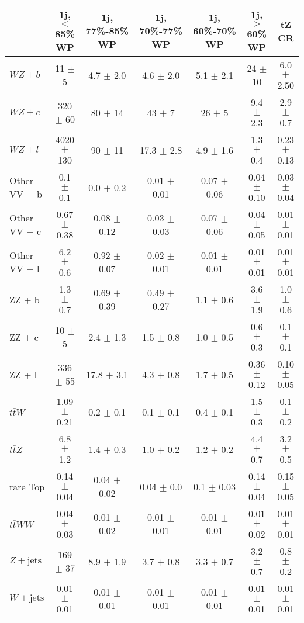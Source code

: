 \begin{tabular}{|l|c|c|c|c|c|c|}
\hline 
 & {1j, $<$85\% WP} & {1j, 77\%-85\% WP} & {1j, 70\%-77\% WP} & {1j, 60\%-70\% WP} & {1j, $>$60\% WP} & {tZ CR}\\
\hline 
  $WZ + b$   & 11 $\pm$ 5 & 4.7 $\pm$ 2.0 & 4.6 $\pm$ 2.0 & 5.1 $\pm$ 2.1 & 24 $\pm$ 10 & 6.0 $\pm$ 2.50 \\ 
  $WZ + c$   & 320 $\pm$ 60 & 80 $\pm$ 14 & 43 $\pm$ 7 & 26 $\pm$ 5 & 9.4 $\pm$ 2.3 & 2.9 $\pm$ 0.7 \\ 
  $WZ + l$   & 4020 $\pm$ 130 & 90 $\pm$ 11 & 17.3 $\pm$ 2.8 & 4.9 $\pm$ 1.6 & 1.3 $\pm$ 0.4 & 0.23 $\pm$ 0.13 \\ 
  Other VV + b   & 0.1 $\pm$ 0.1 & 0.0 $\pm$ 0.2 & 0.01 $\pm$ 0.01 & 0.07 $\pm$ 0.06 & 0.04 $\pm$ 0.10 & 0.03 $\pm$ 0.04 \\ 
  Other VV + c   & 0.67 $\pm$ 0.38 & 0.08 $\pm$ 0.12 & 0.03 $\pm$ 0.03 & 0.07 $\pm$ 0.06 & 0.04 $\pm$ 0.05 & 0.01 $\pm$ 0.01 \\ 
  Other VV + l   & 6.2 $\pm$ 0.6 & 0.92 $\pm$ 0.07 & 0.02 $\pm$ 0.01 & 0.01 $\pm$ 0.01 & 0.01 $\pm$ 0.01 & 0.01 $\pm$ 0.01 \\
  ZZ + b   & 1.3 $\pm$ 0.7 & 0.69 $\pm$ 0.39 & 0.49 $\pm$ 0.27 & 1.1 $\pm$ 0.6 & 3.6 $\pm$ 1.9 & 1.0 $\pm$ 0.6 \\ 
  ZZ + c   & 10 $\pm$ 5 & 2.4 $\pm$ 1.3 & 1.5 $\pm$ 0.8 & 1.0 $\pm$ 0.5 & 0.6 $\pm$ 0.3 & 0.1 $\pm$ 0.1 \\ 
  ZZ + l  & 336 $\pm$ 55 & 17.8 $\pm$ 3.1 & 4.3 $\pm$ 0.8 & 1.7 $\pm$ 0.5 & 0.36 $\pm$ 0.12 & 0.10 $\pm$ 0.05 \\ 
  $t\bar{t}W$   & 1.09 $\pm$ 0.21 & 0.2 $\pm$ 0.1 & 0.1 $\pm$ 0.1 & 0.4 $\pm$ 0.1 & 1.5 $\pm$ 0.3 & 0.1 $\pm$ 0.2 \\ 
  $t\bar{t}Z$   & 6.8 $\pm$ 1.2 & 1.4 $\pm$ 0.3 & 1.0 $\pm$ 0.2 & 1.2 $\pm$ 0.2 & 4.4 $\pm$ 0.7 & 3.2 $\pm$ 0.5 \\ 
  rare Top   & 0.14 $\pm$ 0.04 & 0.04 $\pm$ 0.02 & 0.04 $\pm$ 0.0 & 0.1 $\pm$ 0.03 & 0.14 $\pm$ 0.04 & 0.15 $\pm$ 0.05 \\ 
  $t\bar{t}WW$   & 0.04 $\pm$ 0.03 & 0.01 $\pm$ 0.02 & 0.01 $\pm$ 0.01 & 0.01 $\pm$ 0.01 & 0.01 $\pm$ 0.02 & 0.01 $\pm$ 0.01 \\ 
  $Z+\text{jets}$   & 169 $\pm$ 37 & 8.9 $\pm$ 1.9 & 3.7 $\pm$ 0.8 & 3.3 $\pm$ 0.7 & 3.2 $\pm$ 0.7 & 0.8 $\pm$ 0.2 \\ 
  $W+\text{jets}$   & 0.01 $\pm$ 0.01 & 0.01 $\pm$ 0.01 & 0.01 $\pm$ 0.01 & 0.01 $\pm$ 0.01 & 0.01 $\pm$ 0.01 & 0.01 $\pm$ 0.01 \\ 

\end{tabular}
